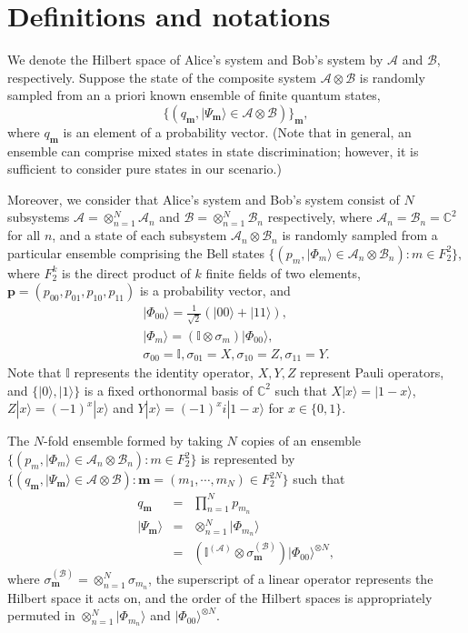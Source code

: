 \documentclass[aps,prx,twocolumn,showpacs,amsmath,notitlepage,amssymb,superscriptaddress]{revtex4-1}
\newcommand{\ket}[1]{| {#1} \rangle}
\begin{document}
\section{Definitions and notations}
We denote the Hilbert space of Alice's system and Bob's system by $\mathcal{A}$ and $\mathcal{B}$, respectively. Suppose the state of the composite system $\mathcal{A}\otimes\mathcal{B}$ is randomly sampled from an a priori known ensemble of finite quantum states,
\begin{equation}
 \{(q_{\mathbf{m}},\ket{\Psi_{\mathbf{m}}}\in\mathcal{A}\otimes\mathcal{B})\}_{\mathbf{m}},
\end{equation}
where $q_{\mathbf{m}}$ is an element of a probability vector. (Note that in general, an ensemble can comprise mixed states in state discrimination; however, it is sufficient to consider pure states in our scenario.)

Moreover, we consider that Alice's system and Bob's system consist of $N$ subsystems $\mathcal{A}=\otimes_{n=1}^N\mathcal{A}_n$ and $\mathcal{B}=\otimes_{n=1}^N\mathcal{B}_n$ respectively, where $\mathcal{A}_n=\mathcal{B}_n=\mathbb{C}^2$ for all $n$, and a state of each subsystem $\mathcal{A}_n\otimes\mathcal{B}_n$ is randomly sampled from a particular ensemble comprising the Bell states $\{(p_{m},\ket{\Phi_{m}}\in\mathcal{A}_n\otimes\mathcal{B}_n):m\in F_2^2\}$, where $F_2^k$ is the direct product of $k$ finite fields of two elements, $\mathbf{p}=(p_{00},p_{01},p_{10},p_{11})$ is a probability vector, and
\begin{eqnarray}
 \ket{\Phi_{00}}=\frac{1}{\sqrt{2}}(\ket{00}+\ket{11}),\\
 \ket{\Phi_m}=(\mathbb{I}\otimes\sigma_{m})\ket{\Phi_{00}},\\
 \sigma_{00}=\mathbb{I},\sigma_{01}=X,\sigma_{10}=Z,\sigma_{11}=Y.
\end{eqnarray}
Note that $\mathbb{I}$ represents the identity operator, $X,Y,Z$ represent Pauli operators, and $\{\ket{0},\ket{1}\}$ is a fixed orthonormal basis of $\mathbb{C}^2$ such that $X\ket{x}=\ket{1-x}$, $Z\ket{x}=(-1)^x\ket{x}$ and $Y\ket{x}=(-1)^xi\ket{1-x}$ for $x\in \{0,1\}$. 

The $N$-fold ensemble formed by taking $N$ copies of an ensemble $\{(p_{m},\ket{\Phi_{m}}\in\mathcal{A}_n\otimes\mathcal{B}_n):m\in F_2^2\}$ is represented by $\{(q_{\mathbf{m}},\ket{\Psi_\mathbf{m}}\in\mathcal{A}\otimes\mathcal{B}):\mathbf{m}=(m_1,\cdots,m_N)\in F_2^{2N}\}$ such that
\begin{eqnarray}
q_{\mathbf{m}}&=&\prod_{n=1}^N p_{m_n}\label{eq:productprob}\\
 \ket{\Psi_{\mathbf{m}}}&=&\otimes_{n=1}^N\ket{\Phi_{m_n}}\\
 &=&(\mathbb{I}^{(\mathcal{A})}\otimes\sigma_{\mathbf{m}}^{(\mathcal{B})})\ket{\Phi_{00}}^{\otimes N},
\end{eqnarray}
where $\sigma_{\mathbf{m}}^{(\mathcal{B})}=\otimes_{n=1}^N\sigma_{m_n}$, the superscript of a linear operator represents the Hilbert space it acts on, and the order of the Hilbert spaces is appropriately permuted in $\otimes_{n=1}^N\ket{\Phi_{m_n}}$ and $\ket{\Phi_{00}}^{\otimes N}$.
\end{document}
